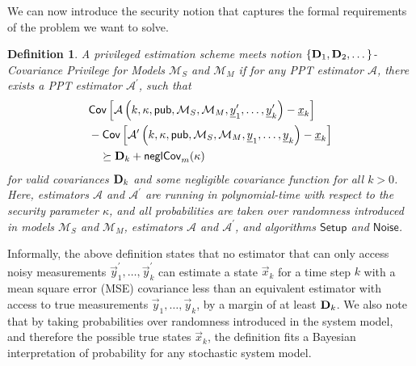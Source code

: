\documentclass[letterpaper, 10 pt, conference]{ieeeconf}
\newtheorem{definition}{Definition}[section]
\begin{document}
We can now introduce the security notion that captures the formal requirements of the problem we want to solve.
\begin{definition}\label{def:cov_privilege_security_notion}
   A privileged estimation scheme meets notion \textit{$\{{{\mathbf{D}}}_1,{{\mathbf{D}}}_2,\dots\}$-Covariance Privilege for Models $\mathcal{M}_S$ and $\mathcal{M}_M$} if for any PPT estimator $\mathcal{A}$, there exists a PPT estimator $\mathcal{A}^\prime$, such that
   \begin{equation}\label{eqn:cov_privilege}
      \begin{split}
         &\mathsf{Cov}\left[\mathcal{A}\left(k, \kappa, \mathsf{pub}, \mathcal{M}_S, \mathcal{M}_M, {\underline{y}}^\prime_1,\dots,{\underline{y}}^\prime_k\right) - {\underline{x}}_k \right]\\
         &-\mathsf{Cov}\left[\mathcal{A}^\prime\left(k, \kappa, \mathsf{pub}, \mathcal{M}_S, \mathcal{M}_M, {\underline{y}}_1,\dots,{\underline{y}}_k\right) - {\underline{x}}_k \right]\\
         &\quad\succeq {\ensuremath{{\mathbf{D}}}}_k + \mathsf{neglCov}_m(\kappa)
      \end{split}
   \end{equation}
   for valid covariances ${{\mathbf{D}}}_k$ and some negligible covariance function for all $k>0$. Here, estimators $\mathcal{A}$ and $\mathcal{A}^\prime$ are running in polynomial-time with respect to the security parameter $\kappa$, and all probabilities are taken over randomness introduced in models $\mathcal{M}_S$ and $\mathcal{M}_M$, estimators $\mathcal{A}$ and $\mathcal{A}^\prime$, and algorithms $\mathsf{Setup}$ and $\mathsf{Noise}$.
\end{definition}

Informally, the above definition states that no estimator that can only access noisy measurements $\vec{y}^\prime_1,\dots,\vec{y}^\prime_k$ can estimate a state $\vec{x}_k$ for a time step $k$ with a mean square error (MSE) covariance less than an equivalent estimator with access to true measurements $\vec{y}_1,\dots,\vec{y}_k$, by a margin of at least ${{\mathbf{D}}}_k$. We also note that by taking probabilities over randomness introduced in the system model, and therefore the possible true states $\vec{x}_k$, the definition fits a Bayesian interpretation of probability for any stochastic system model.

% 
% 
\end{document}
